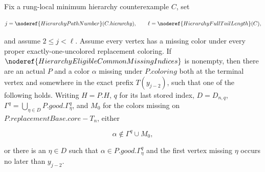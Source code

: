 \begin{lemma}
Fix a rung-local minimum hierarchy counterexample \(C\), set

\[
 j=\noderef{HierarchyPathNumber}(C.\mathit{hierarchy}),\qquad
 \ell=\noderef{HierarchyFullTailLength}(C),
\]

and assume \(2\le j<\ell\).  Assume every vertex has a missing color
under every proper exactly-one-uncolored replacement coloring.  If
\(\noderef{HierarchyEligibleCommonMissingIndices}\) is nonempty, then
there are an actual  \(P\)
and a color \(\alpha\) missing under \(P.\mathit{coloring}\) both at the
terminal vertex and somewhere in the exact prefix \(T(y_{j-2})\), such
that one of the following holds.  Writing \(H=P.H\), \(q\) for its last
stored index, \(D=D_{n,q}\),
\(\Gamma^q=\bigcup_{\eta\in D}P.\mathit{good}.\Gamma^q_\eta\), and
\(M_0\) for the colors missing on
\(P.\mathit{replacementBase}.\mathit{core}-T_n\), either

\[
                       \alpha\notin\Gamma^q\cup M_0,          \tag{A}
\]

or there is an \(\eta\in D\) such that
\(\alpha\in P.\mathit{good}.\Gamma^q_\eta\) and the first vertex missing
\(\eta\) occurs no later than \(y_{j-2}\).
\end{lemma}

